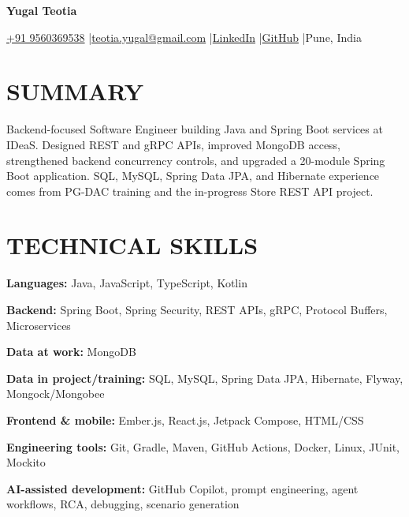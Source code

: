\documentclass[a4paper,10pt]{article}
\begin{document}
{\centering
{\fontsize{19}{22}\selectfont\bfseries Yugal Teotia}\par
\vspace{5pt}
{\small \href{tel:+919560369538}{+91 9560369538} \enspace|\enspace \href{mailto:teotia.yugal@gmail.com}{teotia.yugal@gmail.com} \enspace|\enspace \href{https://www.linkedin.com/in/yugalteotia/}{LinkedIn} \enspace|\enspace \href{https://github.com/yugalteotia}{GitHub} \enspace|\enspace Pune, India}\par
}

\section{SUMMARY}
Backend-focused Software Engineer building Java and Spring Boot services at IDeaS. Designed REST and gRPC APIs, improved MongoDB access, strengthened backend concurrency controls, and upgraded a 20-module Spring Boot application. SQL, MySQL, Spring Data JPA, and Hibernate experience comes from PG-DAC training and the in-progress Store REST API project.

\section{TECHNICAL SKILLS}
\textbf{Languages:} Java, JavaScript, TypeScript, Kotlin\par\vspace{2pt}
\textbf{Backend:} Spring Boot, Spring Security, REST APIs, gRPC, Protocol Buffers, Microservices\par\vspace{2pt}
\textbf{Data at work:} MongoDB\par\vspace{2pt}
\textbf{Data in project/training:} SQL, MySQL, Spring Data JPA, Hibernate, Flyway, Mongock/Mongobee\par\vspace{2pt}
\textbf{Frontend \& mobile:} Ember.js, React.js, Jetpack Compose, HTML/CSS\par\vspace{2pt}
\textbf{Engineering tools:} Git, Gradle, Maven, GitHub Actions, Docker, Linux, JUnit, Mockito\par\vspace{2pt}
\textbf{AI-assisted development:} GitHub Copilot, prompt engineering, agent workflows, RCA, debugging, scenario generation
\end{document}
